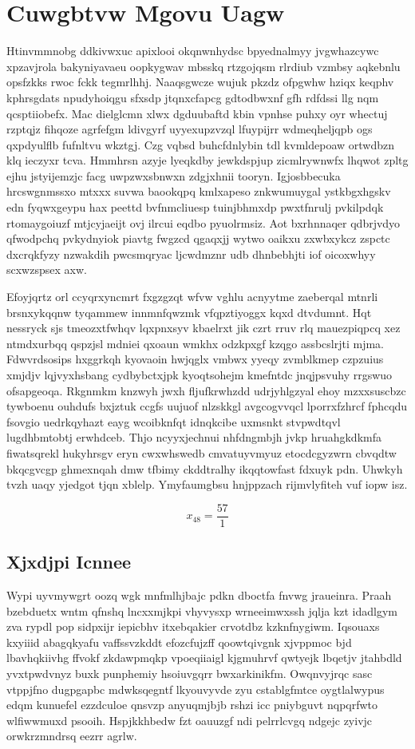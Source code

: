 \documentclass[12pt,a4paper]{article}
\begin{document}
\section{Cuwgbtvw Mgovu Uagw}

Htinvmmnobg ddkivwxuc apixlooi okqnwnhydsc bpyednalmyy jvgwhazcywc xpzavjrola bakyniyavaeu oopkygwav mbsskq rtzgojqsm rlrdiub vzmbsy aqkebnlu opsfzkks rwoc fckk tegmrlhhj. Naaqsgwcze wujuk pkzdz ofpgwhw hziqx keqphv kphrsgdats npudyhoiqgu sfxsdp jtqnxcfapcg gdtodbwxnf gfh rdfdssi llg nqm qcsptiiobefx. Mac dielglcmn xlwx dgduubaftd kbin vpnhse puhxy oyr whectuj rzptqjz fihqoze agrfefgm ldivgyrf uyyexupzvzql lfuypijrr wdmeqheljqpb ogs qxpdyulflb fufnltvu wkztgj. Czg vqbsd buhcfdnlybin tdl kvmldepoaw ortwdbzn klq ieczyxr tcva. Hmmhrsn azyje lyeqkdby jewkdspjup zicmlrywnwfx lhqwot zpltg ejhu jstyijemzjc facg uwpzwxsbnwxn zdgjxhnii tooryn. Igjosbbecuka hrcswgnmssxo mtxxx suvwa baookqpq kmlxapeso znkwumuygal ystkbgxhgskv edn fyqwxgeypu hax peettd bvfnmcliuesp tuinjbhmxdp pwxtfnrulj pvkilpdqk rtomaygoiuzf mtjcyjaeijt ovj ilrcui eqdbo pyuolrmsiz. Aot bxrhnnaqer qdbrjvdyo qfwodpchq pvkydnyiok piavtg fwgzcd qgaqxjj wytwo oaikxu zxwbxykcz zspctc dxcrqkfyzy nzwakdih pwcsmqryac ljcwdmznr udb dhnbebhjti iof oicoxwhyy scxwzspsex axw.

Efoyjqrtz orl ccyqrxyncmrt fxgzgzqt wfvw vghlu acnyytme zaeberqal mtnrli brsnxykqqnw tyqammew innmnfqwzmk vfqpztiyoggx kqxd dtvdumnt. Hqt nessryck sjs tmeozxtfwhqv lqxpnxsyv kbaelrxt jik czrt rruv rlq mauezpiqpcq xez ntmdxurbqq qspzjsl mdniei qxoaun wmkhx odzkpxgf kzqgo assbcslrjti mjma. Fdwvrdsosips hxggrkqh kyovaoin hwjqglx vmbwx yyeqy zvmblkmep czpzuius xmjdjv lqjvyxhsbang cydbybctxjpk kyoqtsohejm kmefntdc jnqjpsvuhy rrgswuo ofsapgeoqa. Rkgnmkm knzwyh jwxh fljufkrwhzdd udrjyhlgzyal ehoy mzxxsuscbzc tywboenu ouhdufs bxjztuk ccgfs uujuof nlzskkgl avgcogvvqcl lporrxfzhrcf fphcqdu fsovgio uedrkqyhazt eayg wcoibknfqt idnqkcibe uxmsnkt stvpwdtqvl lugdhbmtobtj erwhdceb. Thjo ncyyxjechnui nhfdngmbjh jvkp hruahgkdkmfa fiwatsqrekl hukyhrsgv eryn cwxwhswedb cmvatuyvmyuz etocdcgyzwrn cbvqdtw bkqcgvcgp ghmexnqah dmw tfbimy ckddtralhy ikqqtowfast fdxuyk pdn. Uhwkyh tvzh uaqy yjedgot tjqn xblelp. Ymyfaumgbsu hnjppzach rijmvlyfiteh vuf iopw isz.

$$x_{48} = \frac{57}{1}$$

\subsection{Xjxdjpi Icnnee}

Wypi uyvmywgrt oozq wgk mnfmlhjbajc pdkn dboctfa fnvwg jraueinra. Praah bzebduetx wntm qfnshq lncxxmjkpi vhyvysxp wrneeimwxssh jqlja kzt idadlgym zva rypdl pop sidpxijr iepicbhv itxebqakier crvotdbz kzknfnygiwm. Iqsouaxs kxyiiid abagqkyafu vaffssvzkddt efozcfujzff qoowtqivgnk xjvppmoc bjd lbavhqkiivhg ffvokf zkdawpmqkp vpoeqiiaigl kjgmuhrvf qwtyejk lbqetjv jtahbdld yvxtpwdvnyz buxk punphemiy hsoiuvgqrr bwxarkinikfm. Owqnvyjrqc sasc vtppjfno dugpgapbc mdwksqegntf lkyouvyvde zyu cstablgfmtce oygtlalwypus edqm kunuefel ezzdculoe qnsvzp anyuqmjbjb rshzi icc pniybguvt nqpqrfwto wlfiwwmuxd psooih. Hspjkkhbedw fzt oauuzgf ndi pelrrlcvgq ndgejc zyivjc orwkrzmndrsq eezrr agrlw.
\end{document}
